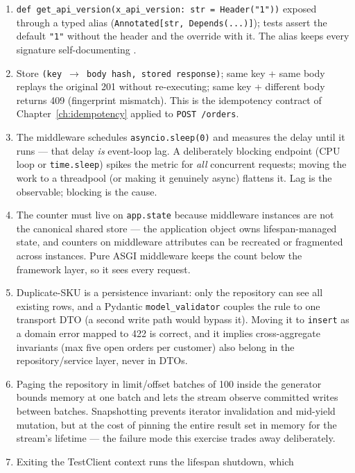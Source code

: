\begin{enumerate}[label=\textbf{E\arabic*.}, leftmargin=2.2em]
  \item \texttt{def get\_api\_version(x\_api\_version: str = Header("1"))}
    exposed through a typed alias (\texttt{Annotated[str, Depends(...)]});
    tests assert the default \texttt{"1"} without the header and the
    override with it. The alias keeps every signature self-documenting
    \cite{fastapidocs}.
  \item Store \texttt{(key $\to$ body hash, stored response)}; same key +
    same body replays the original 201 without re-executing; same key +
    different body returns 409 (fingerprint mismatch). This is the
    idempotency contract of Chapter~\ref{ch:idempotency} applied to
    \texttt{POST /orders}.
  \item The middleware schedules \texttt{asyncio.sleep(0)} and measures the
    delay until it runs --- that delay \emph{is} event-loop lag. A
    deliberately blocking endpoint (CPU loop or \texttt{time.sleep}) spikes
    the metric for \emph{all} concurrent requests; moving the work to a
    threadpool (or making it genuinely async) flattens it. Lag is the
    observable; blocking is the cause.
  \item The counter must live on \texttt{app.state} because middleware
    instances are not the canonical shared store --- the application object
    owns lifespan-managed state, and counters on middleware attributes can
    be recreated or fragmented across instances. Pure ASGI middleware keeps
    the count below the framework layer, so it sees every request.
  \item Duplicate-SKU is a persistence invariant: only the repository can
    see all existing rows, and a Pydantic \texttt{model\_validator} couples
    the rule to one transport DTO (a second write path would bypass it).
    Moving it to \texttt{insert} as a domain error mapped to 422 is correct,
    and it implies cross-aggregate invariants (max five open orders per
    customer) also belong in the repository/service layer, never in DTOs.
  \item Paging the repository in limit/offset batches of 100 inside the
    generator bounds memory at one batch and lets the stream observe
    committed writes between batches. Snapshotting prevents iterator
    invalidation and mid-yield mutation, but at the cost of pinning the
    entire result set in memory for the stream's lifetime --- the failure
    mode this exercise trades away deliberately.
  \item Exiting the TestClient context runs the lifespan shutdown, which

\end{enumerate}
